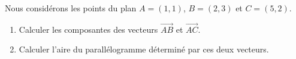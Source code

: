 
\begin{exercice}\label{exoOutilsMath-0099}

    Nous considérons les points du plan $A=(1,1)$, $B=(2,3)$ et $C=(5,2)$.
    \begin{enumerate}
        \item
            Calculer les composantes des vecteurs $\overrightarrow{AB}$ et $\overrightarrow{AC}$.
        \item
            Calculer l'aire du parallélogramme déterminé par ces deux vecteurs.
    \end{enumerate}
    
\end{exercice}
